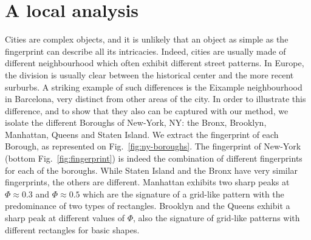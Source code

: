 \section{A local analysis}

Cities are complex objects, and it is unlikely that an object as simple as the
fingerprint can describe all its intricacies. Indeed, cities are usually made of
different neighbourhood which often exhibit different street patterns. In
Europe, the division is usually clear between the historical center and the more
recent surburbs. A striking example of such differences is the Eixample
neighbourhood in Barcelona, very distinct from other areas of the city. In order
to illustrate this difference, and to show that they also can be captured with
our method, we isolate the different Boroughs of New-York, NY: the Bronx,
Brooklyn, Manhattan, Queens and Staten Island. We extract the fingerprint of
each Borough, as represented on Fig.~\ref{fig:ny-boroughs}. The fingerprint of
New-York (bottom Fig.~\ref{fig:fingerprint}) is indeed the combination of
different fingerprints for each of the boroughs. While Staten Island and the
Bronx have very similar fingerprints, the others are different. Manhattan
exhibits two sharp peaks at $\Phi \approx 0.3$ and $\Phi \approx 0.5$ which are
the signature of a grid-like pattern with the predominance of two types of
rectangles. Brooklyn and the Queens exhibit a sharp peak at different values of
$\Phi$, also the signature of grid-like patterns with different rectangles for
basic shapes. 

